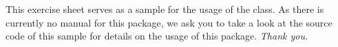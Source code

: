 \documentclass[
  a4paper,
  fleqn,
  nonarrow
    ]{exercisesheet}
\begin{document}
\maketitle

\tableofcontents

\pagestyle{headings}

\sheet[
    title=In the Beginning was the \emph{Foo},
    deadline={1.~September~2011}
  ]

This exercise sheet serves as a sample for the usage of the
\exercisesheet{} class. As there is currently no manual for this
package, we ask you to take a look at the source code of this sample
for details on the usage of this package. \hfill \emph{Thank you.}

\exercise[
    title=This is an Exercise,
    credits=4,
  ]

\blindtext \par \blindtext \par \blindtext \par \blindtext

\subexercise[
    title=This is a Subexercise,
    credits=1,
  ]

\blindtext

\subexercise[
    title=This is another Subexercise,
    credits=3,
  ]

\blindtext


\sheet[
    title=test
  ]
\end{document}
